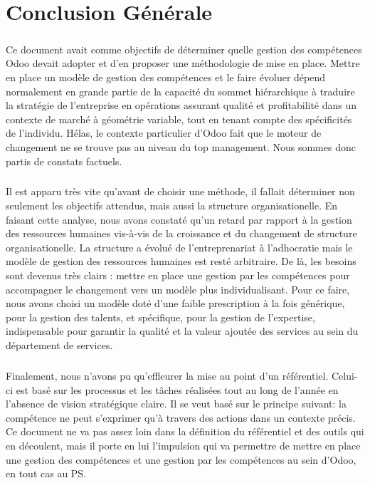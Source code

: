 \chapter*{Conclusion Générale}
\paragraph{}Ce document avait comme objectifs de déterminer quelle gestion des compétences Odoo devait adopter et d'en proposer une méthodologie de mise en place. Mettre en place un modèle de gestion des compétences et le faire évoluer dépend normalement en grande partie de la capacité du sommet hiérarchique à traduire la stratégie de l’entreprise en opérations assurant qualité et profitabilité dans un contexte de marché à géométrie variable, tout en tenant compte des spécificités de l’individu. Hélas, le contexte particulier d'Odoo fait que le moteur de changement ne se trouve pas au niveau du top management. Nous sommes donc partis de constats factuels. 

\paragraph{}Il est apparu très vite qu'avant de choisir une méthode, il fallait déterminer non seulement les objectifs attendus, mais aussi la structure organisationelle. En faisant cette analyse, nous avons constaté qu'un retard par rapport à la gestion des ressources humaines vis-à-vis de la croissance et du changement de structure organisationelle. La structure a évolué de l'entreprenariat à l'adhocratie mais le modèle de gestion des ressources humaines est resté arbitraire. De là, les besoins sont devenus très clairs : mettre en place une gestion par les compétences pour accompagner le changement vers un modèle plus individualisant. Pour ce faire, nous avons choisi un modèle doté d'une faible prescription à la fois générique, pour la gestion des talents, et spécifique, pour la gestion de l'expertise, indispensable pour garantir la qualité et la valeur ajoutée des services au sein du département de services.

\paragraph{} Finalement, nous n'avons pu qu'effleurer la mise au point d'un référentiel. Celui-ci est basé sur les processus et les tâches réalisées tout au long de l'année en l'absence de vision stratégique claire. Il se veut basé sur le principe suivant: la compétence ne peut s'exprimer qu'à travers des actions dans un contexte précis. Ce document ne va pas assez loin dans la définition du référentiel et des outils qui en découlent, mais il porte en lui l'impulsion qui va permettre de mettre en place une gestion des compétences et une gestion par les compétences au sein d'Odoo, en tout cas au PS. 



